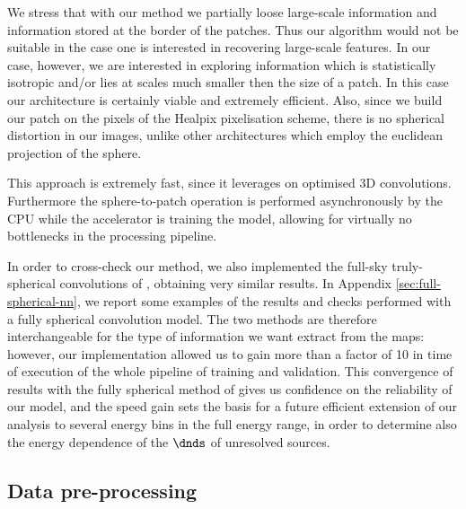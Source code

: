 {  We stress that with our method we partially loose large-scale information and information stored at the border of the patches.
Thus our algorithm would not be suitable in the case one is interested in recovering large-scale features.
In our case, however, we are interested in exploring information which is  statistically isotropic and/or lies at scales much smaller then the size of a patch. In this case our architecture is certainly viable and extremely efficient.}
Also, since  we  build our patch on the pixels of the Healpix pixelisation scheme, there is no spherical distortion in our images, unlike other architectures which employ the euclidean projection of the sphere.

This approach is extremely fast, since it leverages on optimised 3D convolutions. Furthermore the sphere-to-patch operation is performed asynchronously by the CPU while the accelerator is training the model, allowing for virtually no bottlenecks in the processing pipeline.

In order to cross-check our method, we also implemented the full-sky truly-spherical convolutions of \cite{nnhealpix}, obtaining very similar results. {  In  Appendix \ref{sec:full-spherical-nn}, we report some examples of the results and checks performed with a fully spherical convolution model.} The two methods are therefore interchangeable for the type of information we want extract from the \fermi maps: however, our implementation allowed us to gain more than a factor of 10 in time of execution of the whole pipeline of training and validation. This convergence of results with the fully spherical method of \cite{nnhealpix} gives us confidence on the reliability of our model, and the speed gain sets the basis for a future efficient extension of our analysis to several energy bins in the full \fermi energy range, in order to determine also the energy dependence of the $\dnds$  of unresolved sources.


\subsection{Data pre-processing}
\label{sec:preprocessing}

